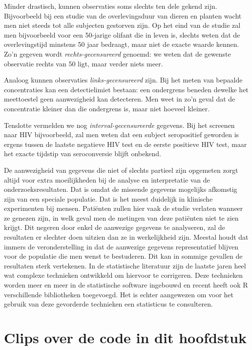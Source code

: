 \documentclass[
  12pt,dutch,coursenotes]{book}
\theoremstyle{definition}
\theoremstyle{definition}
\theoremstyle{definition}
\theoremstyle{definition}
\theoremstyle{remark}
\begin{document}
Minder drastisch, kunnen observaties soms slechts ten dele gekend zijn.
Bijvoorbeeld bij een studie van de overlevingsduur van dieren en planten wacht men niet steeds tot
alle subjecten gestorven zijn. Op het eind van de studie zal men bijvoorbeeld voor een 50-jarige
olifant die in leven is, slechts weten dat de overlevingstijd
minstens 50 jaar bedraagt, maar niet de exacte waarde kennen. Zo'n gegeven
wordt \emph{rechts-gecensureerd} genoemd: we weten dat de gewenste
observatie rechts van 50 ligt, maar verder niets meer.

Analoog kunnen observaties \emph{links-gecensureerd} zijn. Bij het meten
van bepaalde concentraties kan een detectielimiet bestaan: een ondergrens beneden
dewelke het meettoestel geen aanwezigheid kan detecteren. Men weet in zo'n
geval dat de concentratie kleiner dan die ondergrens is, maar niet hoeveel
kleiner.

Tenslotte vermelden we nog \emph{interval-gecensureerde} gegevens. Bij het
screenen naar HIV bijvoorbeeld, zal men weten dat een subject seropositief
geworden is ergens tussen de laatste negatieve HIV test en de eerste
positieve HIV test, maar het exacte tijdstip van seroconversie blijft
onbekend.

De aanwezigheid van gegevens die niet of slechts partieel zijn opgemeten zorgt
altijd voor extra moeilijkheden bij de analyse en interpretatie van de
onderzoeksresultaten. Dat is omdat de missende gegevens mogelijks afkomstig zijn
van een speciale populatie. Dat is het meest duidelijk in klinische experimenten bij mensen.
Patiënten zullen hier vaak de studie verlaten wanneer
ze genezen zijn, in welk geval men de metingen van deze patiënten niet te
zien krijgt. Dit negeren door enkel de aanwezige gegevens te analyseren, zal
de resultaten er slechter doen uitzien dan ze in werkelijkheid zijn. Meestal
houdt dat immers de veronderstelling in dat de aanwezige gegevens representatief blijven
voor de populatie die men wenst te bestuderen. Dit kan in sommige gevallen
de resultaten sterk vertekenen. In de statistische literatuur zijn de
laatste jaren heel wat complexe technieken ontwikkeld om hiervoor te
corrigeren. Deze technieken worden meer en meer in de statistische software
ingebouwd en recent heeft ook R verschillende bibliotheken toegevoegd.
Het is
echter aangewezen om voor het gebruik van deze gevorderde technieken een
statisticus te consulteren.

\hypertarget{clips-over-de-code-in-dit-hoofdstuk}{%
\section{Clips over de code in dit hoofdstuk}\label{clips-over-de-code-in-dit-hoofdstuk}}
\end{document}
